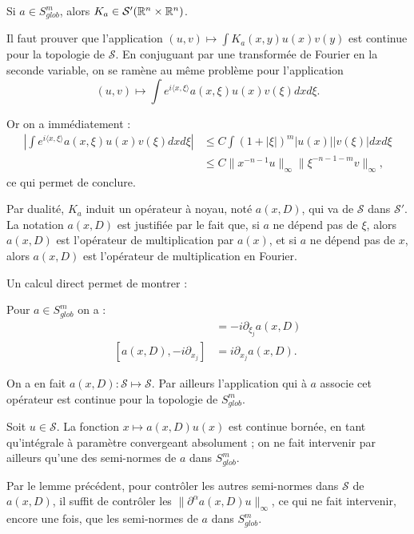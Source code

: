 \begin{prop}
	Si $a \in S^m_{glob}$, alors $K_a \in \mathcal{S}'(\mathbb{R}^n\times \mathbb{R}^n)$.
\end{prop}
\begin{preuve}
	Il faut prouver que l'application $(u,v) \mapsto \int K_a(x,y)u(x)v(y)$ est continue pour la topologie de $\mathcal{S}$. En conjuguant par une transformée de Fourier en la seconde variable, on se ramène au même problème pour l'application
	\begin{equation*}
		(u,v) \mapsto \int e^{i\langle x,\xi \rangle}a(x,\xi)u(x)v(\xi)dxd\xi.
	\end{equation*}
	
	Or on a immédiatement :
	\begin{align*}
		\left|\int e^{i\langle x,\xi \rangle}a(x,\xi)u(x)v(\xi)dxd\xi\right| &\leq C\int(1+|\xi|)^m|u(x)||v(\xi)|dxd\xi\\
		&\leq C\|x^{-n-1}u\|_{\infty}\|\xi^{-n-1-m}v\|_{\infty},
	\end{align*}
	ce qui permet de conclure.
\end{preuve}
Par dualité, $K_a$ induit un opérateur à noyau, noté $a(x,D)$, qui va de $\mathcal{S}$ dans $\mathcal{S'}$. La notation $a(x,D)$ est justifiée par le fait que, si $a$ ne dépend pas de $\xi$, alors $a(x,D)$ est l'opérateur de multiplication par $a(x)$, et si $a$ ne dépend pas de $x$, alors $a(x,D)$ est l'opérateur de multiplication en Fourier.

Un calcul direct permet de montrer :
\begin{lem}
	Pour $a \in S^m_{glob}$ on a :
	\begin{align*}
		[a(x,D),x_j] &= -i\partial_{\xi_j}a(x,D)\\
		[a(x,D),-i\partial_{x_j}] &= i \partial_{x_j}a(x,D).
	\end{align*}
\end{lem}

\begin{corr}
	On a en fait $a(x,D) : \mathcal{S} \mapsto \mathcal{S}$. Par ailleurs l'application qui à $a$ associe cet opérateur est continue pour la topologie de $S^m_{glob}$.
\end{corr}
\begin{preuve}
	Soit $u \in \mathcal{S}$. La fonction $x \mapsto a(x,D)u(x)$ est continue bornée, en tant qu'intégrale à paramètre convergeant absolument ; on ne fait intervenir par ailleurs qu'une des semi-normes de $a$ dans $S^m_{glob}$.
	
	Par le lemme précédent, pour contrôler les autres semi-normes dans $\mathcal{S}$ de $a(x,D)$, il suffit de contrôler les $\|\partial^{\alpha}a(x,D)u\|_{\infty}$, ce qui ne fait intervenir, encore une fois, que les semi-normes de $a$ dans $S^m_{glob}$.
\end{preuve}

